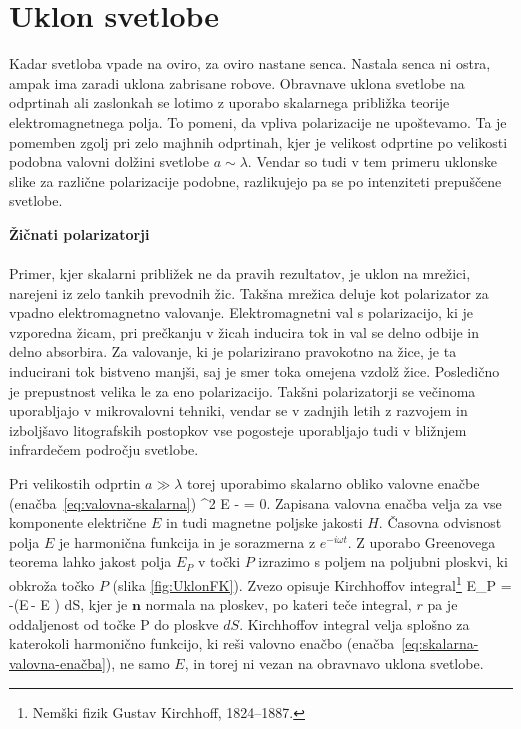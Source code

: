 \section{Uklon svetlobe}
Kadar svetloba vpade na oviro, za oviro nastane senca. Nastala senca ni ostra, ampak
ima zaradi uklona zabrisane robove. Obravnave 
uklona svetlobe na odprtinah ali zaslonkah se lotimo z uporabo
skalarnega približka teorije elektromagnetnega polja. To pomeni, da vpliva 
polarizacije ne upoštevamo. Ta je pomemben zgolj pri zelo majhnih odprtinah, 
kjer je velikost odprtine po velikosti podobna valovni dolžini svetlobe $a \sim \lambda$. 
Vendar so tudi v tem primeru uklonske slike za različne polarizacije podobne, 
razlikujejo pa se po intenziteti prepuščene svetlobe.

\begin{remark}{{\bf Žičnati polarizatorji}}\\ \\
Primer, kjer skalarni približek ne da pravih rezultatov, je uklon na mrežici, narejeni 
iz zelo tankih prevodnih žic. Takšna mrežica deluje kot polarizator za vpadno elektromagnetno valovanje.
Elektromagnetni val s polarizacijo, ki je vzporedna žicam, pri prečkanju v žicah inducira tok
in val se delno odbije in delno absorbira. Za valovanje, ki je polarizirano pravokotno 
na žice, je ta inducirani tok bistveno manjši, saj je smer toka omejena
vzdolž žice. Posledično je prepustnost velika le za eno polarizacijo. 
Takšni polarizatorji se večinoma uporabljajo v mikrovalovni tehniki, 
vendar se v zadnjih letih z razvojem in izboljšavo litografskih postopkov
vse pogosteje uporabljajo tudi v bližnjem infrardečem področju svetlobe.
\end{remark}

Pri velikostih odprtin $a\gg\lambda$ torej uporabimo skalarno obliko valovne enačbe 
(enačba~\ref{eq:valovna-skalarna})
\beq
\nabla^2 E -  = 0.
\label{eq:skalarna-valovna-enačba}
\eeq
Zapisana valovna enačba velja za vse komponente električne $E$ in tudi 
magnetne poljske jakosti $H$. Časovna odvisnost polja $E$ je harmonična funkcija in 
je sorazmerna z $e^{-i \omega t}$. Z uporabo Greenovega teorema lahko 
jakost polja $E_P$ v točki $P$ izrazimo s poljem na poljubni ploskvi, ki obkroža točko $P$ (slika \ref{fig:UklonFK}). 
Zvezo opisuje Kirchhoffov integral\footnote{Nemški fizik Gustav Kirchhoff, 1824--1887.} 
\beq
E_P = -\oint \left(E\,\cdot \nabla {}-
\cdot \nabla E \right) dS,
\label{eq:Kirchhoffov-integral}
\eeq
kjer je $\mathbf{n}$ normala na ploskev, po kateri teče integral, $r$ pa je oddaljenost od točke P
do ploskve $dS$. Kirchhoffov integral velja splošno za katerokoli harmonično 
funkcijo, ki reši valovno enačbo (enačba~\ref{eq:skalarna-valovna-enačba}), ne samo $E$, in torej
ni vezan na obravnavo uklona svetlobe. 

